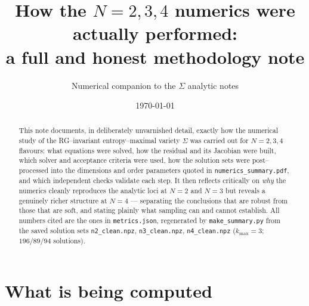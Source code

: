 \documentclass[11pt]{article}
\title{How the $N=2,3,4$ numerics were actually performed:\\
a full and honest methodology note}
\author{Numerical companion to the $\Sigma$ analytic notes}
\date{\today}
\newcommand{\code}[1]{\texttt{#1}}
\begin{document}
\maketitle

\begin{abstract}
This note documents, in deliberately unvarnished detail, exactly how the
numerical study of the RG--invariant entropy--maximal variety $\Sigma$ was
carried out for $N=2,3,4$ flavours: what equations were solved, how the
residual and its Jacobian were built, which solver and acceptance criteria were
used, how the solution sets were post--processed into the dimensions and order
parameters quoted in \code{numerics\_summary.pdf}, and which independent checks
validate each step. It then reflects critically on \emph{why} the numerics
cleanly reproduces the analytic loci at $N=2$ and $N=3$ but reveals a genuinely
richer structure at $N=4$ --- separating the conclusions that are robust from
those that are soft, and stating plainly what sampling can and cannot establish.
All numbers cited are the ones in \code{metrics.json}, regenerated by
\code{make\_summary.py} from the saved solution sets
\code{n2\_clean.npz}, \code{n3\_clean.npz}, \code{n4\_clean.npz}
($k_{\max}=3$; $196/89/94$ solutions).
\end{abstract}

\section{What is being computed}
\label{sec:object}
\end{document}
